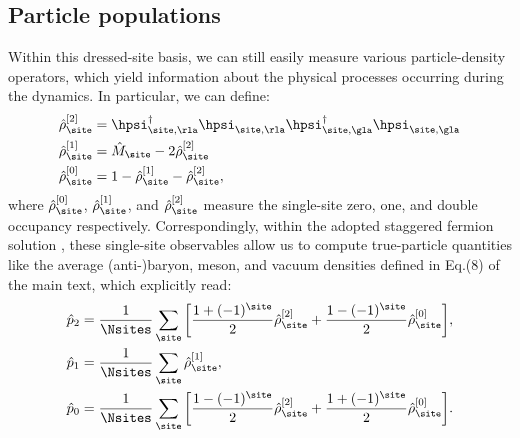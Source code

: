 \documentclass[aps,prl,reprint,twocolumn,superscriptaddress,floatfix,nofootinbib]{revtex4-2}
\begin{document}
\subsection{Particle populations}
Within this dressed-site basis, we can still easily measure various particle-density operators, which yield information about the physical processes occurring during the dynamics.
In particular, we can define:
\begin{subequations}
    \begin{align}
        \hat{\rho}_{\site}^{[2]} &
        =\hpsi_{\site,\rla}^{\dagger}
        \hpsi_{\site,\rla}
        \hpsi_{\site,\gla}^{\dagger}
        \hpsi_{\site,\gla}                         \\
        \hat{\rho}_{\site}^{[1]} &
        =\hat{M}_{\site}-2\hat{\rho}_{\site}^{[2]} \\
        \hat{\rho}_{\site}^{[0]} &
        =1-\hat{\rho}^{[1]}_{\site}-\hat{\rho}_{\site}^{[2]},
    \end{align}
\end{subequations}
where $\hat{\rho}_{\site}^{[0]}$, $\hat{\rho}_{\site}^{[1]}$, and $\hat{\rho}_{\site}^{[2]}$ measure the single-site zero, one, and double occupancy respectively.
Correspondingly, within the adopted staggered fermion solution \cite{Susskind1977LatticeFermions}, these single-site observables allow us to compute true-particle quantities like the average (anti-)baryon, meson, and vacuum densities defined in Eq.(8) of the main text, which explicitly read:
\begin{subequations}
    \begin{align}
        \hat{p}_2 & =\frac{1}{\Nsites}\sum_{\site}\qty[
            \frac{1+(-1)^{\site}}{2}\hat{\rho}_{\site}^{[2]}+
        \frac{1-(-1)^{\site}}{2}\hat{\rho}_{\site}^{[0]}],                  \\
        \hat{p}_1 & =\frac{1}{\Nsites}\sum_{\site}\hat{\rho}_{\site}^{[1]}, \\
        \hat{p}_0 & =\frac{1}{\Nsites}\sum_{\site}\qty[
            \frac{1-(-1)^{\site}}{2}\hat{\rho}_{\site}^{[2]}+
            \frac{1+(-1)^{\site}}{2}\hat{\rho}_{\site}^{[0]}].
    \end{align}
    \label{eq_particle_densities}
\end{subequations}
\end{document}
